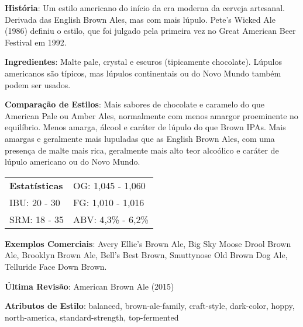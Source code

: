 \textbf{História}: Um estilo americano do início da era moderna da cerveja artesanal. Derivada das English Brown Ales, mas com mais lúpulo. Pete's Wicked Ale (1986) definiu o estilo, que foi julgado pela primeira vez no Great American Beer Festival em 1992.

\textbf{Ingredientes}: Malte pale, crystal e escuros (tipicamente chocolate). Lúpulos americanos são típicos, mas lúpulos continentais ou do Novo Mundo também podem ser usados.

\textbf{Comparação de Estilos}: Mais sabores de chocolate e caramelo do que American Pale ou Amber Ales, normalmente com menos amargor proeminente no equilíbrio. Menos amarga, álcool e caráter de lúpulo do que Brown IPAs. Mais amargas e geralmente mais lupuladas que as English Brown Ales, com uma presença de malte mais rica, geralmente mais alto teor alcoólico e caráter de lúpulo americano ou do Novo Mundo.

\begin{tabular}{@{}p{35mm}p{35mm}@{}}
  \textbf{Estatísticas} & OG: 1,045 - 1,060 \\
  IBU: 20 - 30  & FG: 1,010 - 1,016 \\
  SRM: 18 - 35  & ABV: 4,3\% - 6,2\%
\end{tabular}

\textbf{Exemplos Comerciais}: Avery Ellie’s Brown Ale, Big Sky Moose Drool Brown Ale, Brooklyn Brown Ale, Bell’s Best Brown, Smuttynose Old Brown Dog Ale, Telluride Face Down Brown.

\textbf{Última Revisão}: American Brown Ale (2015)

\textbf{Atributos de Estilo}: balanced, brown-ale-family, craft-style, dark-color, hoppy, north-america, standard-strength, top-fermented
